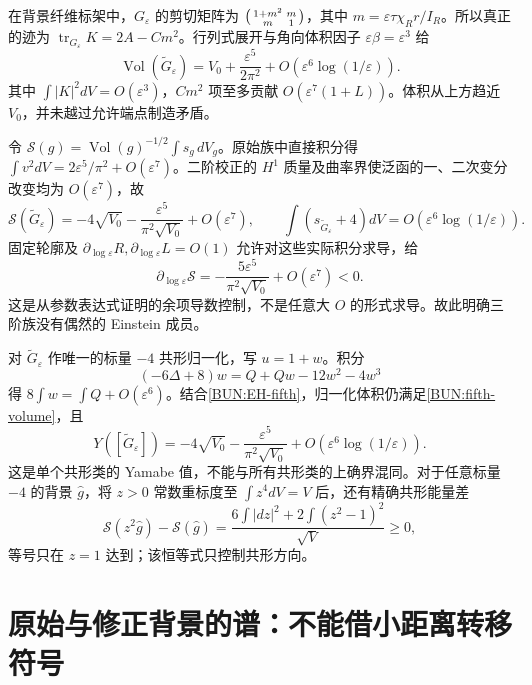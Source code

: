 \documentclass[UTF8,fontset=fandol,zihao=-4,oneside,openany]{ctexbook}
\theoremstyle{cjkplain}
\numberwithin{equation}{chapter}
\begin{document}
在背景纤维标架中，$G_\varepsilon$ 的剪切矩阵为
$\begin{psmallmatrix}1+m^2&m\\m&1\end{psmallmatrix}$，其中
$m=\varepsilon\tau\chi_Rr/I_R$。所以真正的迹为
$\operatorname{tr}_{G_\varepsilon}K=2A-Cm^2$。行列式展开与角向体积因子 $\varepsilon\beta=\varepsilon^3$ 给
\begin{equation}
 \boxed{\operatorname{Vol}(\widetilde G_\varepsilon)
 =V_0+\frac{\varepsilon^5}{2\pi^2}
 +O(\varepsilon^6\log(1/\varepsilon)).}
 \label{BUN:fifth-volume}
\end{equation}
其中 $\int|K|^2dV=O(\varepsilon^3)$，$Cm^2$ 项至多贡献 $O(\varepsilon^7(1+L))$。体积从上方趋近 $V_0$，并未越过允许端点制造矛盾。

令 $\mathcal S(g)=\operatorname{Vol}(g)^{-1/2}\int s_g\,dV_g$。原始族中直接积分得 $\int v^2dV=2\varepsilon^5/\pi^2+O(\varepsilon^7)$。二阶校正的 $H^1$ 质量及曲率界使泛函的一、二次变分改变均为 $O(\varepsilon^7)$，故
\begin{equation}
 \mathcal S(\widetilde G_\varepsilon)
 =-4\sqrt{V_0}-\frac{\varepsilon^5}{\pi^2\sqrt{V_0}}+O(\varepsilon^7),
 \qquad \int(s_{\widetilde G_\varepsilon}+4)dV
 =O(\varepsilon^6\log(1/\varepsilon)).
 \label{BUN:EH-fifth}
\end{equation}
固定轮廓及 $\partial_{\log\varepsilon}R,\partial_{\log\varepsilon}L=O(1)$ 允许对这些实际积分求导，给
\[\partial_{\log\varepsilon}\mathcal S=-\frac{5\varepsilon^5}{\pi^2\sqrt{V_0}}+O(\varepsilon^7)<0.\]
这是从参数表达式证明的余项导数控制，不是任意大 $O$ 的形式求导。故此明确三阶族没有偶然的 Einstein 成员。

对 $\widetilde G_\varepsilon$ 作唯一的标量 $-4$ 共形归一化，写 $u=1+w$。积分
\[
 (-6\Delta+8)w=Q+Qw-12w^2-4w^3
\]
得 $8\int w=\int Q+O(\varepsilon^6)$。结合\eqref{BUN:EH-fifth}，归一化体积仍满足\eqref{BUN:fifth-volume}，且
\[
 Y([\widetilde G_\varepsilon])
 =-4\sqrt{V_0}-\frac{\varepsilon^5}{\pi^2\sqrt{V_0}}
 +O(\varepsilon^6\log(1/\varepsilon)).
\]
这是单个共形类的 Yamabe 值，不能与所有共形类的上确界混同。对于任意标量 $-4$ 的背景 $\widehat g$，将 $z>0$ 常数重标度至 $\int z^4dV=V$ 后，还有精确共形能量差
\[
 \mathcal S(z^2\widehat g)-\mathcal S(\widehat g)
 =\frac{6\int|dz|^2+2\int(z^2-1)^2}{\sqrt V}\ge0,
\]
等号只在 $z=1$ 达到；该恒等式只控制共形方向。

\section{原始与修正背景的谱：不能借小距离转移符号}
\label{BUN:near-spectrum}
\end{document}
